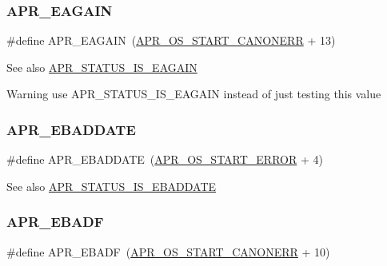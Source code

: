 \subsubsection{\texorpdfstring{A\+P\+R\+\_\+\+E\+A\+G\+A\+IN}{APR\_EAGAIN}}
{\footnotesize\ttfamily \#define A\+P\+R\+\_\+\+E\+A\+G\+A\+IN~(\mbox{\hyperlink{group__apr__errno_ga7bca957c11b80b31cb54b0d2cbe9e025}{A\+P\+R\+\_\+\+O\+S\+\_\+\+S\+T\+A\+R\+T\+\_\+\+C\+A\+N\+O\+N\+E\+RR}} + 13)}

\begin{DoxySeeAlso}{See also}
\mbox{\hyperlink{group___a_p_r___s_t_a_t_u_s___i_s_ga9dd578bfcd76a2d997395608ae5b3a4e}{A\+P\+R\+\_\+\+S\+T\+A\+T\+U\+S\+\_\+\+I\+S\+\_\+\+E\+A\+G\+A\+IN}} 
\end{DoxySeeAlso}
\begin{DoxyWarning}{Warning}
use A\+P\+R\+\_\+\+S\+T\+A\+T\+U\+S\+\_\+\+I\+S\+\_\+\+E\+A\+G\+A\+IN instead of just testing this value 
\end{DoxyWarning}
\mbox{\label{group___a_p_r___error_ga7911720c540a929cc08a2c25e606b56e}} 
\subsubsection{\texorpdfstring{A\+P\+R\+\_\+\+E\+B\+A\+D\+D\+A\+TE}{APR\_EBADDATE}}
{\footnotesize\ttfamily \#define A\+P\+R\+\_\+\+E\+B\+A\+D\+D\+A\+TE~(\mbox{\hyperlink{group__apr__errno_ga191894048b7bd0cca3cf0bdff1eb695b}{A\+P\+R\+\_\+\+O\+S\+\_\+\+S\+T\+A\+R\+T\+\_\+\+E\+R\+R\+OR}} + 4)}

\begin{DoxySeeAlso}{See also}
\mbox{\hyperlink{group___a_p_r___s_t_a_t_u_s___i_s_gaf1313bed3538d6d57995bca164ebac20}{A\+P\+R\+\_\+\+S\+T\+A\+T\+U\+S\+\_\+\+I\+S\+\_\+\+E\+B\+A\+D\+D\+A\+TE}} 
\end{DoxySeeAlso}
\mbox{\label{group___a_p_r___error_ga204df8a37a5c7fd6b2c74ea098fbac02}} 
\subsubsection{\texorpdfstring{A\+P\+R\+\_\+\+E\+B\+A\+DF}{APR\_EBADF}}
{\footnotesize\ttfamily \#define A\+P\+R\+\_\+\+E\+B\+A\+DF~(\mbox{\hyperlink{group__apr__errno_ga7bca957c11b80b31cb54b0d2cbe9e025}{A\+P\+R\+\_\+\+O\+S\+\_\+\+S\+T\+A\+R\+T\+\_\+\+C\+A\+N\+O\+N\+E\+RR}} + 10)}

